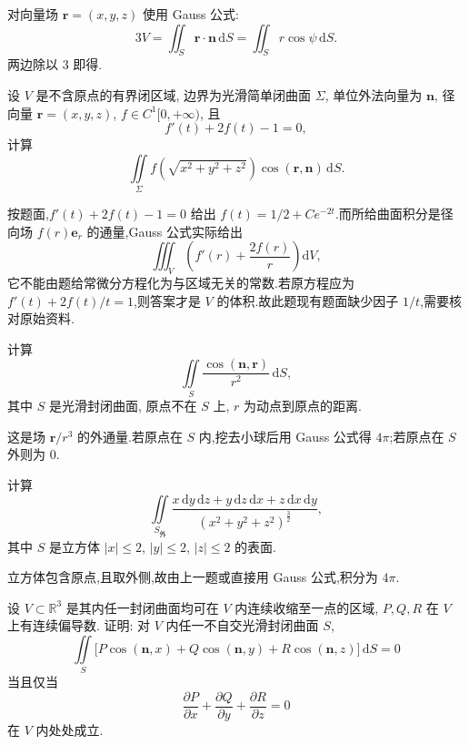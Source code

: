\begin{solution}
    对向量场 $\bm r=(x,y,z)$ 使用 Gauss 公式:
    \[
        3V=\iint_S\bm r\cdot\bm n\,\mathrm{d}S
        =\iint_Sr\cos\psi\,\mathrm{d}S.
    \]
    两边除以 $3$ 即得.
\end{solution}

\begin{example}
    设 $V$ 是不含原点的有界闭区域, 边界为光滑简单闭曲面 $\Sigma$, 单位外法向量为 $\bm n$, 径向量 $\bm r=(x,y,z)$, $f\in C^1\lbrack0,+\infty)$, 且
    \[
        f'(t)+2f(t)-1=0,
    \]
    计算
    \[
        \iint\limits_\Sigma f\left(\sqrt{x^2+y^2+z^2}\right)\cos(\bm r,\bm n)\,\mathrm{d}S.
    \]
\end{example}
\exampleblank

\begin{solution}
    按题面,$f'(t)+2f(t)-1=0$ 给出 $f(t)=1/2+Ce^{-2t}$.而所给曲面积分是径向场 $f(r)\bm e_r$ 的通量,Gauss 公式实际给出
    \[
        \iiint_V\left(f'(r)+\dfrac{2f(r)}{r}\right)\mathrm{d}V,
    \]
    它不能由题给常微分方程化为与区域无关的常数.若原方程应为 $f'(t)+2f(t)/t=1$,则答案才是 $V$ 的体积.故此题现有题面缺少因子 $1/t$,需要核对原始资料.
\end{solution}

\begin{example}
    计算
    \[
        \iint\limits_S\dfrac{\cos(\bm n,\bm r)}{r^2}\,\mathrm{d}S,
    \]
    其中 $S$ 是光滑封闭曲面, 原点不在 $S$ 上, $r$ 为动点到原点的距离.
\end{example}
\exampleblank

\begin{solution}
    这是场 $\bm r/r^3$ 的外通量.若原点在 $S$ 内,挖去小球后用 Gauss 公式得 $4\pi$;若原点在 $S$ 外则为 $0$.
\end{solution}

\begin{example}
    计算
    \[
        \iint\limits_{S_{\text{外}}}\dfrac{x\,\mathrm{d}y\,\mathrm{d}z+y\,\mathrm{d}z\,\mathrm{d}x+z\,\mathrm{d}x\,\mathrm{d}y}{(x^2+y^2+z^2)^{\frac{3}{2}}},
    \]
    其中 $S$ 是立方体 $|x|\leq2$, $|y|\leq2$, $|z|\leq2$ 的表面.
\end{example}
\exampleblank

\begin{solution}
    立方体包含原点,且取外侧,故由上一题或直接用 Gauss 公式,积分为 $4\pi$.
\end{solution}

\begin{example}
    设 $V\subset\mathbb{R}^3$ 是其内任一封闭曲面均可在 $V$ 内连续收缩至一点的区域, $P,Q,R$ 在 $V$ 上有连续偏导数. 证明: 对 $V$ 内任一不自交光滑封闭曲面 $S$,
    \[
        \iint\limits_S\bigl\lbrack P\cos(\bm n,x)+Q\cos(\bm n,y)+R\cos(\bm n,z)\bigr\rbrack\,\mathrm{d}S=0
    \]
    当且仅当
    \[
        \dfrac{\partial P}{\partial x}+\dfrac{\partial Q}{\partial y}+\dfrac{\partial R}{\partial z}=0
    \]
    在 $V$ 内处处成立.
\end{example}
\exampleblank

